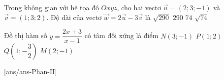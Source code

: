\begin{ex}%
	Trong không gian với hệ tọa độ $Oxyz$, cho hai vectơ $\overrightarrow{u}=(2;3;-1)$ và $\overrightarrow{v}=(1;3;2)$. Độ dài của vectơ $\overrightarrow{w}=2\overrightarrow{u}-3\overrightarrow{v}$ là
	\choice
	{$\sqrt{290}$}
	{$290$}
	{$74$}
	{\True $\sqrt{74}$}
\end{ex}

\begin{ex}%
	Đồ thị hàm số $y=\dfrac{2x+3}{x-1}$ có tâm đối xứng là điểm
	\choice
	{$N(3;-1)$}
	{\True $P(1;2)$}
	{$Q\left(1;-\dfrac{3}{2}\right)$}
	{$M(2;-1)$}
\end{ex}

\cauds
{}[ans/ans\currfilebase-Phan-II]

